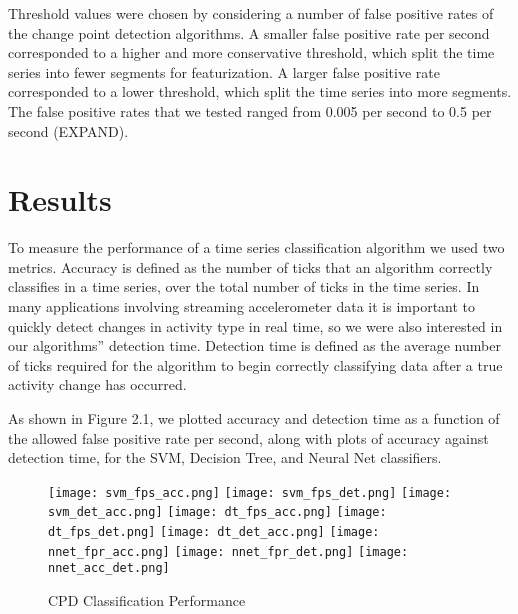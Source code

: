 Threshold values were chosen by considering a number of false positive rates of
the change point detection algorithms. A smaller false positive rate per second
corresponded to a higher and more conservative threshold, which split the
time series into fewer segments for featurization. A larger false positive rate
corresponded to a lower threshold, which split the time series into more segments.
The false positive rates that we tested ranged from 0.005 per second to 0.5 per second (EXPAND).

\section{Results}
To measure the performance of a time series classification algorithm we used
two metrics. Accuracy is defined as the number of
ticks that an algorithm correctly classifies in a time series, over the total number of ticks
in the time series. In many applications involving streaming accelerometer data
it is important to quickly detect changes in activity type in real time, so we
were also interested in our algorithms'' detection time.
Detection time is defined as the average number of ticks
required for the algorithm to begin correctly classifying data after a
true activity change has occurred.

As shown in Figure 2.1, we plotted accuracy and detection time as a function of the allowed
false positive rate per second, along with plots of accuracy against detection
time, for the SVM, Decision Tree, and Neural Net classifiers.

\begin{figure}
 \centering
 \texttt{[image: svm\_fps\_acc.png]}
 \texttt{[image: svm\_fps\_det.png]}
 \texttt{[image: svm\_det\_acc.png]}
 \texttt{[image: dt\_fps\_acc.png]}
 \texttt{[image: dt\_fps\_det.png]}
 \texttt{[image: dt\_det\_acc.png]}
 \texttt{[image: nnet\_fpr\_acc.png]}
 \texttt{[image: nnet\_fpr\_det.png]}
 \texttt{[image: nnet\_acc\_det.png]}
 \caption{CPD Classification Performance}
\end{figure}
